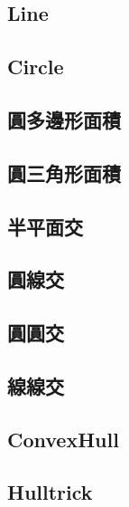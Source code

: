 \documentclass[a4paper,10pt,twocolumn,oneside]{article}
\begin{document}
    \subsection{Line}
    

    \subsection{Circle}
    

    \subsection{圓多邊形面積}
    

    \subsection{圓三角形面積}
    

    \subsection{半平面交}
    

    \subsection{圓線交}
    

    \subsection{圓圓交}
    

    \subsection{線線交}
    

    \subsection{ConvexHull}
    

    \subsection{Hulltrick}
    
\end{document}
